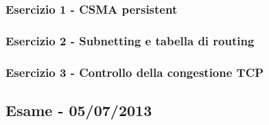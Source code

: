 \documentclass[a4paper]{article}
\begin{document}
	\subsubsection{Esercizio 1 - CSMA persistent}
	
	\subsubsection{Esercizio 2 - Subnetting e tabella di routing}
	
	\subsubsection{Esercizio 3 - Controllo della congestione TCP}
	
	\newpage
	
	\subsection[\textbf{Esame - 05/07/2013}]{Esame - 05/07/2013}
	
\end{document}
